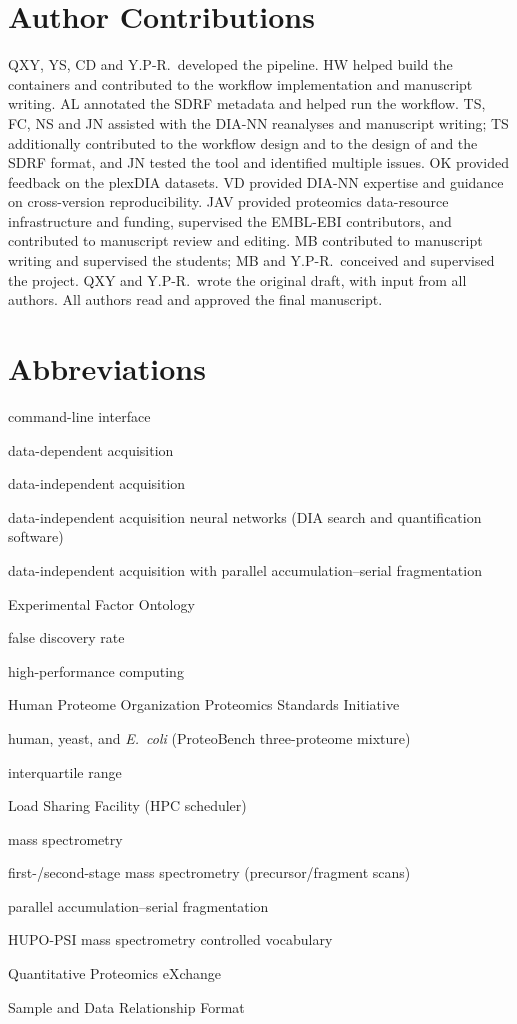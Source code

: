 \documentclass[preprint,12pt]{elsarticle}
\begin{document}
\section*{Author Contributions}
QXY, YS, CD and Y.P-R.\ developed the pipeline. HW helped build the containers and contributed to the workflow implementation and manuscript writing. AL annotated the SDRF metadata and helped run the workflow.
TS, FC, NS and JN assisted with the DIA-NN reanalyses and manuscript writing; TS additionally contributed to the workflow design and to the design of \qpx{} and the SDRF format, and JN tested the tool and identified multiple issues. OK provided feedback on the plexDIA datasets. VD provided DIA-NN expertise and guidance on cross-version reproducibility. JAV provided proteomics data-resource infrastructure and funding, supervised the EMBL-EBI contributors, and contributed to manuscript review and editing. MB contributed to manuscript writing and supervised the students; MB and Y.P-R.\ conceived and supervised the project. QXY and Y.P-R.\ wrote the original draft, with input from all authors. All authors read and approved the final manuscript.

\section*{Abbreviations}
\begin{description}[leftmargin=5.5em,style=nextline,itemsep=0pt,parsep=0pt]
\item[CLI] command-line interface
\item[DDA] data-dependent acquisition
\item[DIA] data-independent acquisition
\item[DIA-NN] data-independent acquisition neural networks (DIA search and quantification software)
\item[diaPASEF] data-independent acquisition with parallel accumulation--serial fragmentation
\item[EFO] Experimental Factor Ontology
\item[FDR] false discovery rate
\item[HPC] high-performance computing
\item[HUPO-PSI] Human Proteome Organization Proteomics Standards Initiative
\item[HYE] human, yeast, and \textit{E.\ coli} (ProteoBench three-proteome mixture)
\item[IQR] interquartile range
\item[LSF] Load Sharing Facility (HPC scheduler)
\item[MS] mass spectrometry
\item[MS1/MS2] first-/second-stage mass spectrometry (precursor/fragment scans)
\item[PASEF] parallel accumulation--serial fragmentation
\item[PSI-MS] HUPO-PSI mass spectrometry controlled vocabulary
\item[QPX] Quantitative Proteomics eXchange
\item[SDRF] Sample and Data Relationship Format
\end{description}



\end{document}
